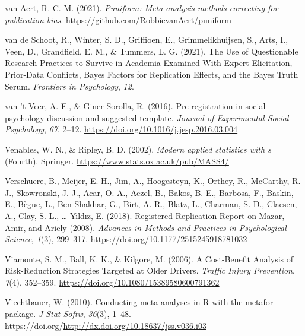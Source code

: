 \documentclass[
  oneside]{krantz}
\newlength{\cslhangindent}
\newlength{\cslentryspacingunit} %
\newenvironment{CSLReferences}[2] %
 {%
  \setlength{\parindent}{0pt}
  \ifodd #1
  \let\oldpar\par
  \def\par{\hangindent=\cslhangindent\oldpar}
  \fi
  \setlength{\parskip}{#2\cslentryspacingunit}
 }%
 {}
\begin{document}
\begin{CSLReferences}{1}{0}
\leavevmode{}%
van Aert, R. C. M. (2021). \emph{Puniform: Meta-analysis methods
correcting for publication bias}.
\url{https://github.com/RobbievanAert/puniform}

\leavevmode{}%
van de Schoot, R., Winter, S. D., Griffioen, E., Grimmelikhuijsen, S.,
Arts, I., Veen, D., Grandfield, E. M., \& Tummers, L. G. (2021). The
{Use} of {Questionable Research Practices} to {Survive} in {Academia
Examined With Expert Elicitation}, {Prior-Data Conflicts}, {Bayes
Factors} for {Replication Effects}, and the {Bayes Truth Serum}.
\emph{Frontiers in Psychology}, \emph{12}.

\leavevmode{}%
van 't Veer, A. E., \& Giner-Sorolla, R. (2016). Pre-registration in
social psychology discussion and suggested template.
\emph{Journal of Experimental Social Psychology}, \emph{67}, 2--12.
\url{https://doi.org/10.1016/j.jesp.2016.03.004}

\leavevmode{}%
Venables, W. N., \& Ripley, B. D. (2002). \emph{Modern applied
statistics with s} (Fourth). Springer.
\url{https://www.stats.ox.ac.uk/pub/MASS4/}

\leavevmode{}%
Verschuere, B., Meijer, E. H., Jim, A., Hoogesteyn, K., Orthey, R.,
McCarthy, R. J., Skowronski, J. J., Acar, O. A., Aczel, B., Bakos, B.
E., Barbosa, F., Baskin, E., Bègue, L., Ben-Shakhar, G., Birt, A. R.,
Blatz, L., Charman, S. D., Claesen, A., Clay, S. L., \ldots{} Yıldız, E.
(2018). Registered {Replication Report} on {Mazar}, {Amir}, and {Ariely}
(2008). \emph{Advances in Methods and Practices in Psychological
Science}, \emph{1}(3), 299--317.
\url{https://doi.org/10.1177/2515245918781032}

\leavevmode{}%
Viamonte, S. M., Ball, K. K., \& Kilgore, M. (2006). A {Cost-Benefit
Analysis} of {Risk-Reduction Strategies Targeted} at {Older Drivers}.
\emph{Traffic Injury Prevention}, \emph{7}(4), 352--359.
\url{https://doi.org/10.1080/15389580600791362}

\leavevmode{}%
Viechtbauer, W. (2010). Conducting meta-analyses in {R} with the metafor
package. \emph{J Stat Softw}, \emph{36}(3), 1--48.
https://doi.org/\url{http://dx.doi.org/10.18637/jss.v036.i03}


\end{CSLReferences}
\end{document}

